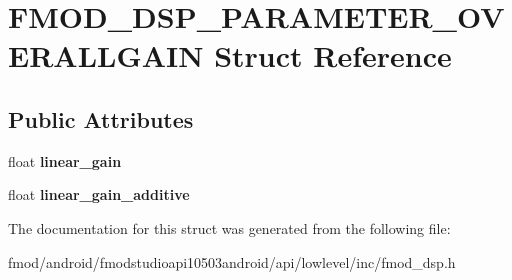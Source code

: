 \hypertarget{struct_f_m_o_d___d_s_p___p_a_r_a_m_e_t_e_r___o_v_e_r_a_l_l_g_a_i_n}{\section{F\+M\+O\+D\+\_\+\+D\+S\+P\+\_\+\+P\+A\+R\+A\+M\+E\+T\+E\+R\+\_\+\+O\+V\+E\+R\+A\+L\+L\+G\+A\+I\+N Struct Reference}
\label{struct_f_m_o_d___d_s_p___p_a_r_a_m_e_t_e_r___o_v_e_r_a_l_l_g_a_i_n}
}
\subsection*{Public Attributes}
\begin{DoxyCompactItemize}
\item 
\hypertarget{struct_f_m_o_d___d_s_p___p_a_r_a_m_e_t_e_r___o_v_e_r_a_l_l_g_a_i_n_a3d9f9459849cf076b0daba5a1486705e}{float {\bfseries linear\+\_\+gain}}\label{struct_f_m_o_d___d_s_p___p_a_r_a_m_e_t_e_r___o_v_e_r_a_l_l_g_a_i_n_a3d9f9459849cf076b0daba5a1486705e}

\item 
\hypertarget{struct_f_m_o_d___d_s_p___p_a_r_a_m_e_t_e_r___o_v_e_r_a_l_l_g_a_i_n_a634eb7a98720e0f9295243ac28031c7f}{float {\bfseries linear\+\_\+gain\+\_\+additive}}\label{struct_f_m_o_d___d_s_p___p_a_r_a_m_e_t_e_r___o_v_e_r_a_l_l_g_a_i_n_a634eb7a98720e0f9295243ac28031c7f}

\end{DoxyCompactItemize}


The documentation for this struct was generated from the following file\+:\begin{DoxyCompactItemize}
\item 
fmod/android/fmodstudioapi10503android/api/lowlevel/inc/fmod\+\_\+dsp.\+h\end{DoxyCompactItemize}
